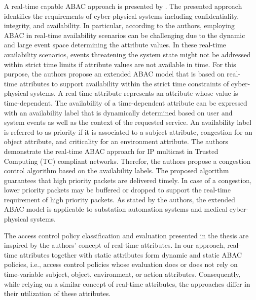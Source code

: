 A real-time capable ABAC approach is presented by \citeauthor{Burmester2013} \cite{Burmester2013}.
The presented approach identifies the requirements of cyber-physical systems including confidentiality, integrity, and availability.
In particular, according to the authors, employing ABAC in real-time availability scenarios can be challenging due to the dynamic and large event space determining the attribute values.
In these real-time availability scenarios, events threatening the system state might not be addressed within strict time limits if attribute values are not available in time.
For this purpose, the authors propose an extended ABAC model that is based on real-time attributes to support availability within the strict time constraints of cyber-physical systems.
A real-time attribute represents an attribute whose value is time-dependent.
The availability of a time-dependent attribute can be expressed with an availability label that is dynamically determined based on user and system events as well as the context of the requested service.
An availability label is referred to as priority if it is associated to a subject attribute, congestion for an object attribute, and criticality for an environment attribute.
The authors demonstrate the real-time ABAC approach for IP multicast in Trusted Computing (TC) compliant networks.
Therefor, the authors propose a congestion control algorithm based on the availability labels.
The proposed algorithm guarantees that high priority packets are delivered timely.
In case of a congestion, lower priority packets may be buffered or dropped to support the real-time requirement of high priority packets.
As stated by the authors, the extended ABAC model is applicable to substation automation systems and medical cyber-physical systems.

The access control policy classification and evaluation presented in the thesis are inspired by the authors' concept of real-time attributes.
In our approach, real-time attributes together with static attributes form dynamic and static ABAC policies, i.e., access control policies whose evaluation does or does not rely on time-variable subject, object, environment, or action attributes.
Consequently, while relying on a similar concept of real-time attributes, the approaches differ in their utilization of these attributes.

